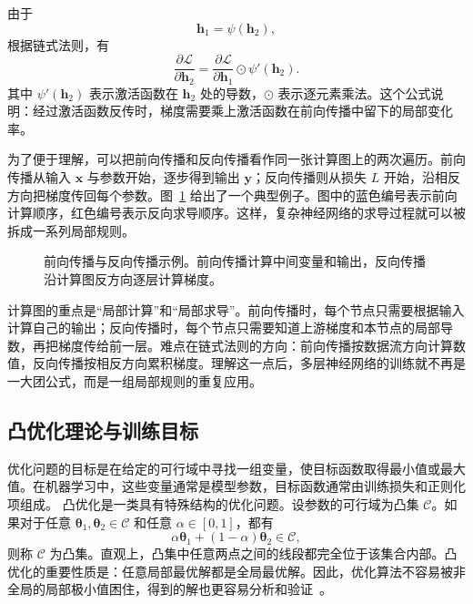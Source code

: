 由于
\[
\mathbf{h}_1=\psi(\mathbf{h}_2),
\]
根据链式法则，有
\[
\frac{\partial \mathcal{L}}{\partial \mathbf{h}_2}
=
\frac{\partial \mathcal{L}}{\partial \mathbf{h}_1}
\odot
\psi'(\mathbf{h}_2).
\]
其中 $\psi'(\mathbf{h}_2)$ 表示激活函数在 $\mathbf{h}_2$ 处的导数，$\odot$ 表示逐元素乘法。这个公式说明：经过激活函数反传时，梯度需要乘上激活函数在前向传播中留下的局部变化率。

为了便于理解，可以把前向传播和反向传播看作同一张计算图上的两次遍历。前向传播从输入 $\mathbf{x}$ 与参数开始，逐步得到输出 $\mathbf{y}$；反向传播则从损失 $L$ 开始，沿相反方向把梯度传回每个参数。图~\ref{fig:aml-forward-backward-example} 给出了一个典型例子。图中的蓝色编号表示前向计算顺序，红色编号表示反向求导顺序。这样，复杂神经网络的求导过程就可以被拆成一系列局部规则。

\begin{figure}[htbp]
  \centering
  
  \caption{前向传播与反向传播示例。前向传播计算中间变量和输出，反向传播沿计算图反方向逐层计算梯度。}
  \label{fig:aml-forward-backward-example}
\end{figure}

\begin{importantnote}
  计算图的重点是“局部计算”和“局部求导”。前向传播时，每个节点只需要根据输入计算自己的输出；反向传播时，每个节点只需要知道上游梯度和本节点的局部导数，再把梯度传给前一层。难点在链式法则的方向：前向传播按数据流方向计算数值，反向传播按相反方向累积梯度。理解这一点后，多层神经网络的训练就不再是一大团公式，而是一组局部规则的重复应用。
\end{importantnote}


\subsection{凸优化理论与训练目标}

优化问题的目标是在给定的可行域中寻找一组变量，使目标函数取得最小值或最大值。在机器学习中，这些变量通常是模型参数，目标函数通常由训练损失和正则化项组成。 凸优化是一类具有特殊结构的优化问题。设参数的可行域为凸集 $\mathcal{C}$。如果对于任意 $\boldsymbol{\theta}_1,\boldsymbol{\theta}_2\in\mathcal{C}$ 和任意 $\alpha\in[0,1]$，都有
\[
\alpha\boldsymbol{\theta}_1
+
(1-\alpha)\boldsymbol{\theta}_2
\in\mathcal{C},
\]
则称 $\mathcal{C}$ 为凸集。直观上，凸集中任意两点之间的线段都完全位于该集合内部。凸优化的重要性质是：任意局部最优解都是全局最优解。因此，优化算法不容易被非全局的局部极小值困住，得到的解也更容易分析和验证~\cite{BoydVandenberghe2004Convex}。


